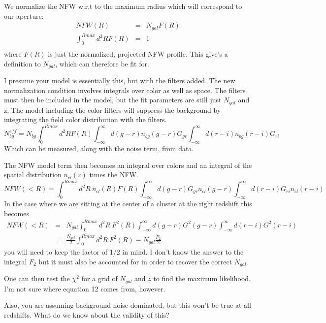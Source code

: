 \documentclass[12pt]{article}
\begin{document}
We normalize the NFW w.r.t to the maximum radius which will correspond to our
aperture:
\begin{eqnarray}
NFW(R) & = & N_{gal} F(R) \nonumber \\
\int_{0}^{Rmax} d^{2} R F(R) & = & 1 \\
\end{eqnarray}
where $F(R)$ is just the normalized, projected NFW profile. This give's a 
definition to $N_{gal}$, which can therefore be fit for.  

I presume your model is essentially this, but with the filters added.  The new
normalization condition involves integrals over color as well as space.  The
filters must then be included in the model, but the fit parameters are still
just $N_{gal}$ and z. The model including the color filters will suppress the
background by integrating the field color distribution with the filters.
\begin{equation}
N^{eff}_{bg} = N_{bg} \int_{0}^{Rmax}d^{2} R F(R) \int_{-\infty}^{\infty} d(g-r) n_{bg}(g-r) G_{gr} \int_{-\infty}^{\infty} d(r-i) n_{bg}(r-i) G_{ri}
\end{equation}
Which can be measured, along with the noise term, from data.  

The NFW model term then becomes an integral over colors
and an integral of the spatial distribution $n_{cl}(r)$ times the NFW. 
\begin{equation}
NFW(<R) = \int_{0}^{Rmax} d^{2} R~n_{cl}(R) F(R) \int_{-\infty}^{\infty} d(g-r) G_{gr} n_{cl}(g-r) \int_{-\infty}^{\infty} d(r-i)  G_{ri} n_{cl}(r-i) 
\end{equation}
In the case where we are sitting at the center of a cluster at the right
redshift this becomes
\begin{eqnarray}
NFW(<R) & = & N_{gal} \int_{0}^{Rmax} d^{2} R ~F^{2}(R) \int_{-\infty}^{\infty} d(g-r) G^{2}(g-r) \int_{-\infty}^{\infty} d(r-i) G^{2}(r-i) \nonumber \\
  & = & \frac{N_{gal}}{2} \int_{0}^{Rmax} d^{2} R ~F^{2}(R) \equiv N_{gal} \frac{F_2}{2}
\end{eqnarray}
you will need to keep the factor of 1/2 in mind.  I don't know the answer
to the integral $F_2$  but it must also be accounted for in order to
recover the correct $N_{gal}$

One can then test the $\chi^{2}$ for a grid of $N_{gal}$ and $z$ to find the
maximum likelihood.  I'm not sure where equation 12 comes from, however.

Also, you are assuming background noise dominated, but this won't be true
at all redshifts. What do we know about the validity of this?
\end{document}
